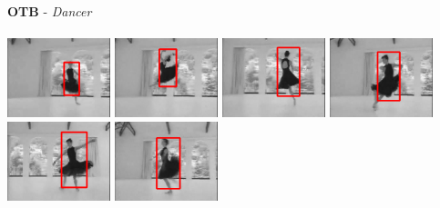 \documentclass[10pt,twocolumn,letterpaper,french]{article}
\begin{document}
\begin{appendices}
\begin{center}
  \textbf{OTB} - \textit{Dancer}\\
  \hspace{1cm}\\
  \includegraphics[width=85pt]{images/exemples/ok/dancer/000001.png}
  \includegraphics[width=85pt]{images/exemples/ok/dancer/000036.png}
  \includegraphics[width=85pt]{images/exemples/ok/dancer/000088.png}
  \includegraphics[width=85pt]{images/exemples/ok/dancer/000149.png}
  \includegraphics[width=85pt]{images/exemples/ok/dancer/000192.png}
  \includegraphics[width=85pt]{images/exemples/ok/dancer/000225.png}\\
  \hspace{1cm}\\
  \hspace{1cm}\\


\end{center}
\end{appendices}
\end{document}
